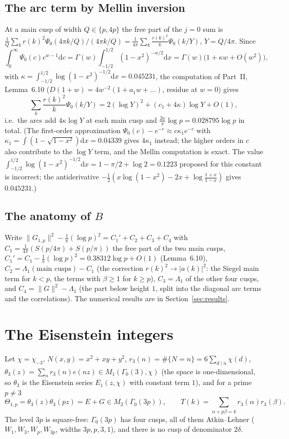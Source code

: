 \documentclass[11pt]{amsart}
\theoremstyle{remark}
\newcommand{\dd}{\mathrm{d}}
\begin{document}
\subsection{The arc term by Mellin inversion}
At a main cusp of width $Q\in\{p,4p\}$ the free part of the $j=0$ sum is $\frac1Q\sum_kr(k)^2\Psi_0(4\pi k/Q)/(4\pi k/Q)=\frac1{4\pi}\sum_k\frac{r(k)^2}k\Psi_0(k/Y)$, $Y=Q/4\pi$. Since
\[
\int_0^\infty\Psi_0(c)c^{w-1}\dd c=\Gamma(w)\int_{-1/2}^{1/2}(1-x^2)^{-w/2}\dd x=\Gamma(w)\bigl(1+\kappa w+O(w^2)\bigr),
\]
with $\kappa=\int_{-1/2}^{1/2}\log(1-x^2)^{-1/2}\dd x=0.045231$,
the computation of Part~II, Lemma~6.10 ($D(1+w)=4w^{-2}(1+a_1w+\dots)$, residue at $w=0$) gives
\[
\sum_k\frac{r(k)^2}k\Psi_0(k/Y)=2(\log Y)^2+(c_1+4\kappa)\log Y+O(1),
\]
i.e.\ the arcs add $4\kappa\log Y$ at each main cusp and $\frac{2\kappa}\pi\log p=0.028795\log p$ in total. (The first-order approximation $\Psi_0(c)-e^{-c}\approx c\kappa_1e^{-c}$ with $\kappa_1=\int(1-\sqrt{1-x^2})\dd x=0.04339$ gives $4\kappa_1$ instead; the higher orders in $c$ also contribute to the $\log Y$ term, and the Mellin computation is exact. The value $\int_{-1/2}^{1/2}\log(1-x^2)^{-1/2}\dd x=1-\pi/2+\log2=0.1223$ proposed for this constant is incorrect; the antiderivative $-\frac12(x\log(1-x^2)-2x+\log\frac{1+x}{1-x})$ gives $0.045231$.)

\subsection{The anatomy of $B$}
Write $\|G_{1,p}\|^2-\frac1\pi(\log p)^2=C_1'+C_2+C_3+C_4$ with $C_1=\frac1{4\pi}(S(p/4\pi)+S(p/\pi))$ the free part of the two main cusps, $C_1'=C_1-\frac1\pi(\log p)^2=0.38312\log p+O(1)$ (Lemma~6.10), $C_2=\Lambda_1(\text{main cusps})-C_1$ (the correction $r(k)^2\to|a(k)|^2$: the Siegel main term for $k<p$, the terms with $\beta\ge1$ for $k\ge p$), $C_3=\Lambda_1$ of the other four cusps, and $C_4=\|G\|^2-\Lambda_1$ (the part below height $1$, split into the diagonal arc terms and the correlations). The numerical results are in Section~\ref{sec:results}.

\section{The Eisenstein integers}\label{sec:D3}
Let $\chi=\chi_{-3}$, $N(x,y)=x^2+xy+y^2$, $r_3(n)=\#\{N=n\}=6\sum_{d\mid n}\chi(d)$, $\theta_3(z)=\sum_nr_3(n)e(nz)\in M_1(\Gamma_0(3),\chi)$ (the space is one-dimensional, so $\theta_3$ is the Eisenstein series $E_1(z,\chi)$ with constant term $1$), and for a prime $p\ne3$
\[
\Theta_{1,p}=\theta_3(z)\theta_3(pz)=E+G\in M_2(\Gamma_0(3p)),\qquad T(k)=\sum_{\alpha+p\beta=k}r_3(\alpha)r_3(\beta).
\]
The level $3p$ is square-free: $\Gamma_0(3p)$ has four cusps, all of them Atkin--Lehner ($W_1,W_3,W_p,W_{3p}$, widths $3p,p,3,1$), and there is no cusp of denominator $2\delta$.
\end{document}
